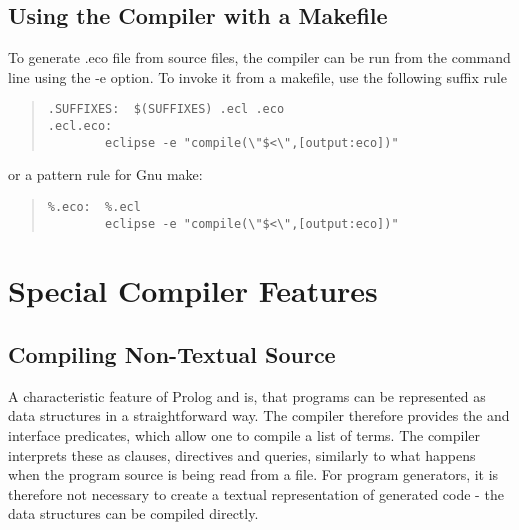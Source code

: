 \subsection{Using the Compiler with a Makefile}

To generate .eco file from source files, the compiler can be run from the
command line using the -e option.
To invoke it from a makefile, use the following suffix rule
\begin{quote}
\begin{verbatim}
.SUFFIXES:  $(SUFFIXES) .ecl .eco
.ecl.eco:
        eclipse -e "compile(\"$<\",[output:eco])"
\end{verbatim}
\end{quote}
or a pattern rule for Gnu make:
\begin{quote}
\begin{verbatim}
%.eco:  %.ecl
        eclipse -e "compile(\"$<\",[output:eco])"
\end{verbatim}
\end{quote}



\section{Special Compiler Features}

\subsection{Compiling Non-Textual Source}
A characteristic feature of Prolog and {\eclipse} is, that programs can
be represented as data structures in a straightforward way.
The compiler therefore provides the
 and
interface predicates, which allow one to compile a list of terms.  The compiler
interprets these as clauses, directives and queries, similarly to what happens
when the program
source is being read from a file.  For program generators, it is therefore
not necessary to create a textual representation of generated code -
the data structures can be compiled directly.

